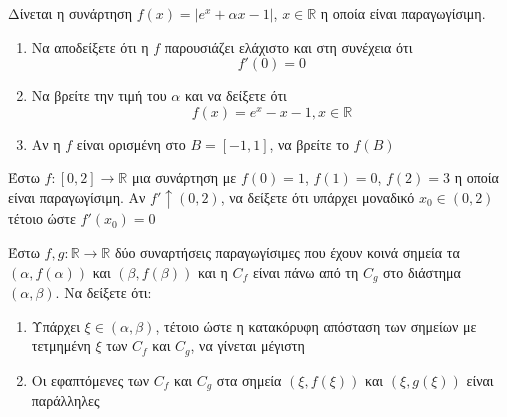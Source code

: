 \documentclass{presentation}
\begin{document}
\begin{askisi}
    Δίνεται η συνάρτηση $f(x)=|e^x+αx-1|$, $x\in\mathbb{R}$ η οποία είναι παραγωγίσιμη.
    \begin{enumerate}
        \item<1-> Να αποδείξετε ότι η $f$ παρουσιάζει ελάχιστο και στη συνέχεια ότι
            $$f'(0)=0$$
        \item<2-> Να βρείτε την τιμή του $α$ και να δείξετε ότι
            $$f(x)=e^x-x-1,x\in\mathbb{R}$$
        \item<3-> Αν η $f$ είναι ορισμένη στο $Β=[-1,1]$, να βρείτε το $f(Β)$
    \end{enumerate}

\end{askisi}

\begin{askisi}
    Έστω $f:[0,2]\to\mathbb{R}$ μια συνάρτηση με $f(0)=1$, $f(1)=0$, $f(2)=3$ η οποία είναι παραγωγίσιμη. Αν $f'\uparrow (0,2)$, να δείξετε ότι υπάρχει μοναδικό $x_0\in (0,2)$ τέτοιο ώστε $f'(x_0)=0$

\end{askisi}

\begin{askisi}
    Έστω $f,g:\mathbb{R}\to\mathbb{R}$ δύο συναρτήσεις παραγωγίσιμες που έχουν κοινά σημεία τα $(α,f(α))$ και $(β,f(β))$ και η $C_f$ είναι πάνω από τη $C_g$ στο διάστημα $(α,β)$. Να δείξετε ότι:
    \begin{enumerate}
        \item<1-> Υπάρχει $ξ\in (α,β)$, τέτοιο ώστε η κατακόρυφη απόσταση των σημείων με τετμημένη $ξ$ των $C_f$ και $C_g$, να γίνεται μέγιστη
        \item<2-> Οι εφαπτόμενες των $C_f$ και $C_g$ στα σημεία $(ξ,f(ξ))$ και $(ξ,g(ξ))$ είναι παράλληλες
    \end{enumerate}

\end{askisi}


\appendix
\end{document}
